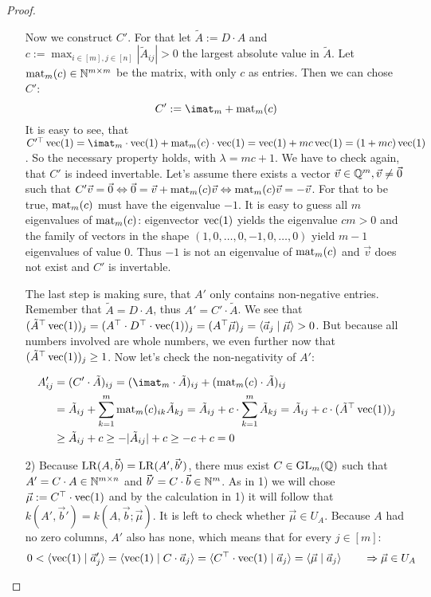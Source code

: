 \begin{proof}
\begin{enumerate}
        Now we construct $C'$. For that let $\tilde A := D \cdot A$ and $c := \max_{i \in [m], j\in[n]} |\tilde A_{ij}| > 0$ the largest absolute value in $\tilde A$. Let $\operatorname{mat}_m(c) \in \mathbb{N}^{m\times m}$ be the matrix, with only $c$ as entries. Then we can chose $C'$:
        $$C' := \imat_m + \opmat_m(c)$$
        It is easy to see, that $C'^\top \opvec(1) = \imat_m\cdot \opvec(1) + \opmat_m(c)\cdot \opvec(1) = \opvec(1) + mc \opvec(1) = (1 + mc)\opvec(1)$. So the necessary property holds, with $\lambda = mc+1$. We have to check again, that $C'$ is indeed invertable. Let's assume there exists a vector $\vec v \in \mathbb{Q}^m, \vec v \neq \vec0$ such that $C'\vec v = \vec 0 \Leftrightarrow \vec0 = \vec v + \operatorname{mat}_m(c)\vec v \Leftrightarrow \operatorname{mat}_m(c)\vec v = -\vec v$. For that to be true, $\operatorname{mat}_m(c)$ must have the eigenvalue $-1$. It is easy to guess all $m$ eigenvalues of $\operatorname{mat}_m(c)$: eigenvector $\operatorname{vec}(1)$ yields the eigenvalue $cm>0$ and the family of vectors in the shape $(1, 0, \dots, 0, -1, 0, \dots, 0)$ yield $m-1$ eigenvalues of value $0$. Thus $-1$ is not an eigenvalue of $\operatorname{mat}_m(c)$ and $\vec v$ does not exist and $C'$ is invertable.

        The last step is making sure, that $A'$ only contains non-negative entries. Remember that $\tilde A = D \cdot A$, thus $A' = C' \cdot \tilde A$. We see that $(\tilde A^\top \operatorname{vec}(1))_j =(A^\top\cdot D^\top\cdot \operatorname{vec}(1))_j = (A^\top \vec\mu)_j = \langle \vec a_j \mid \vec\mu \rangle > 0$. But because all numbers involved are whole numbers, we even further now that $(\tilde A^\top \operatorname{vec}(1))_j \geq 1$. Now let's check the non-negativity of $A'$:

        \begin{align*}
            A'_{ij} &= (C'\cdot \tilde A)_{ij} = (\imat_m \cdot \tilde A)_{ij} + (\opmat_m(c)\cdot \tilde A)_{ij}\\
            &= \tilde A_{ij} + \sum_{k=1}^{m}\opmat_m(c)_{ik} \tilde A_{kj} = \tilde A_{ij} + c \cdot \sum_{k=1}^{m} \tilde A_{kj} = \tilde A_{ij} + c \cdot (\tilde A^\top \opvec(1))_j\\
            &\geq \tilde A_{ij} + c \geq - |\tilde A_{ij}| + c \geq - c + c = 0
        \end{align*}
        
        \item[2)] Because $\operatorname{LR}(A, \vec b) = \operatorname{LR}(A', \vec b')$, there mus exist $C \in \operatorname{GL}_m(\mathbb{Q})$ such that $A' = C \cdot A \in \mathbb{N}^{m \times n}$ and $\vec b' = C \cdot \vec b \in \mathbb{N}^m$. As in 1) we will chose $\vec \mu := C^\top \cdot \operatorname{vec}(1)$ and by the calculation in 1) it will follow that $k(A', \vec b') = k(A, \vec b; \vec\mu)$. It is left to check whether $\vec \mu \in U_A$. Because $A$ had no zero columns, $A'$ also has none, which means that for every $j \in [m]$:
        $$0 < \langle \operatorname{vec}(1) \mid \vec a'_j \rangle = \langle \operatorname{vec}(1) \mid C \cdot \vec a_j \rangle = \langle C^\top \cdot \operatorname{vec}(1) \mid \vec a_j \rangle = \langle \vec \mu \mid \vec a_j \rangle \qquad \Rightarrow\vec \mu \in U_A$$

    \end{enumerate}
\end{proof}

